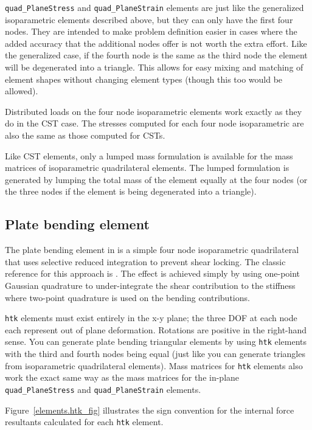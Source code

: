 {\tt quad\_PlaneStress} and {\tt quad\_PlaneStrain}
elements are just like the generalized 
isoparametric elements described above, but they can only have the first four 
nodes.  They are intended to make problem definition easier in cases where the 
added accuracy that the additional nodes offer is not worth the extra effort.  
Like the generalized case, if the fourth node is the same as the third node 
the element will be degenerated into a triangle.  This allows for easy mixing 
and matching of element shapes without changing element types (though this too 
would be allowed).  	

Distributed loads on the four node isoparametric elements work exactly as 
they do in the CST case.  The stresses computed for each four node 
isoparametric are also the same as those computed for CSTs.  

Like CST elements, only a lumped mass formulation is available for the mass
matrices of isoparametric quadrilateral elements.  The lumped formulation is
generated by lumping the total mass of the element equally at the four nodes
(or the three nodes if the element is being degenerated into a triangle).

\subsection{Plate bending element}
\label{elements.htk}

The plate bending element in \felt{} is a simple four node isoparametric 
quadrilateral that uses selective reduced integration to prevent 
shear locking.  The classic reference for this approach is \cite{htk:simple}.  
The effect is achieved simply by using one-point Gaussian quadrature to 
under-integrate the shear contribution to the stiffness where two-point 
quadrature is used on the bending contributions. 

{\tt htk} elements must exist entirely in the x-y plane; the three DOF
at each node each represent out of plane deformation.  Rotations are
positive in the right-hand sense.  You can generate plate bending triangular 
elements by using {\tt htk} elements with the third and fourth nodes being 
equal (just like you can generate triangles from isoparametric quadrilateral 
elements). Mass matrices for {\tt htk} elements also work the exact same 
way as the mass matrices for the in-plane {\tt quad\_PlaneStress} and
{\tt quad\_PlaneStrain} elements.

Figure~\ref{elements.htk_fig} illustrates the sign convention for the internal
force resultants calculated for each {\tt htk} element.

